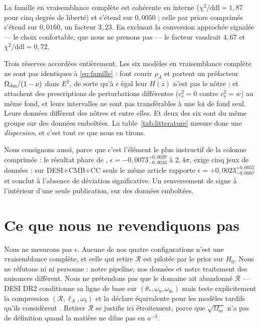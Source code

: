 \documentclass[11pt,a4paper]{article}
\begin{document}
La famille en vraisemblance complète est cohérente en interne
($\chi^2/\mathrm{ddl}=1{,}87$ pour cinq degrés de liberté) et s'étend sur $0{,}0050$ ; celle
par priors comprimés s'étend sur $0{,}0160$, un facteur $3{,}23$. En excluant la conversion
approchée signalée --- le choix confortable, que nous ne prenons pas --- le facteur vaudrait
$4{,}67$ et $\chi^2/\mathrm{ddl}=0{,}72$.

Trois réserves accordées entièrement. Les six modèles en vraisemblance complète ne sont pas
identiques à \eqref{eq:famille} : \citet{tsiapi2019} font courir $\rho_\Lambda$ et portent un
préfacteur $\Omega_{\rm dm}/(1-\nu)$ dans $E^2$, de sorte qu'à $\epsilon$ égal leur $H(z)$
n'est pas le nôtre ; \citet{kumar2025} et \citet{yaoliu2025} attachent des prescriptions de
perturbations différentes ($c_s^2=0$ contre $c_s^2=w$) au même fond, et leurs intervalles ne
sont pas transférables à une loi de fond seul. Leurs données diffèrent des nôtres et entre
elles. Et deux des six sont du même groupe sur des données emboîtées. La
table~\ref{tab:litterature} mesure donc une \emph{dispersion}, et c'est tout ce que nous en
tirons.

Nous consignons aussi, parce que c'est l'élément le plus instructif de la colonne comprimée :
le résultat phare de \citet{yang2025}, $\epsilon=-0{,}0073^{+0{,}0029}_{-0{,}0033}$ à
$2{,}4\sigma$, exige cinq jeux de données ; sur DESI$+$CMB$+$CC seuls le même article rapporte
$\epsilon=+0{,}0023^{+0{,}0055}_{-0{,}0067}$ et conclut à l'absence de déviation
significative. Un renversement de signe à l'intérieur d'une seule publication, sur des données
emboîtées.

\section{Ce que nous ne revendiquons pas}
\label{sec:limites}

Nous ne mesurons pas $\epsilon$. Aucune de nos quatre configurations n'est une vraisemblance
complète, et celle qui retire $\mathcal{R}$ est pilotée par le prior sur $H_0$. Nous ne
réfutons ni \citet{yang2025} ni personne : notre pipeline, nos données et notre traitement des
nuisances diffèrent. Nous ne prétendons pas que le domaine ait abandonné $\mathcal{R}$ ---
DESI DR2 conditionne sa ligne de base sur $(\theta_\ast,\omega_b,\omega_{bc})$ mais teste
explicitement la compression $(\mathcal{R},\ell_A,\omega_b)$ et la déclare équivalente pour
les modèles tardifs qu'ils considèrent \citep{desidr2}. Retirer $\mathcal{R}$ se justifie ici
étroitement, parce que $\sqrt{\Omega_m}$ n'a pas de définition quand la matière ne dilue pas
en $a^{-3}$.
\end{document}
